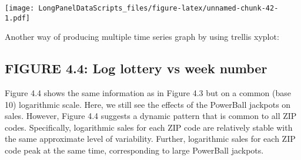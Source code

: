 \documentclass[]{book}
\newenvironment{Shaded}{\begin{snugshade}}{\end{snugshade}}
\newcommand{\CommentTok}[1]{\textcolor[rgb]{0.56,0.35,0.01}{\textit{#1}}}
\newcommand{\DataTypeTok}[1]{\textcolor[rgb]{0.13,0.29,0.53}{#1}}
\newcommand{\DecValTok}[1]{\textcolor[rgb]{0.00,0.00,0.81}{#1}}
\newcommand{\KeywordTok}[1]{\textcolor[rgb]{0.13,0.29,0.53}{\textbf{#1}}}
\newcommand{\NormalTok}[1]{#1}
\newcommand{\OperatorTok}[1]{\textcolor[rgb]{0.81,0.36,0.00}{\textbf{#1}}}
\newcommand{\StringTok}[1]{\textcolor[rgb]{0.31,0.60,0.02}{#1}}
\begin{document}
\texttt{[image: LongPanelDataScripts\_files/figure-latex/unnamed-chunk-42-1.pdf]}

Another way of producing multiple time series graph by using trellis xyplot:

\begin{Shaded}
\end{Shaded}

\hypertarget{figure-4.4-log-lottery-vs-week-number}{%
\subsection{FIGURE 4.4: Log lottery vs week number}\label{figure-4.4-log-lottery-vs-week-number}}

Figure 4.4 shows the same information as in Figure 4.3 but on a common (base 10) logarithmic scale. Here, we still see the effects of the PowerBall jackpots on sales. However, Figure 4.4 suggests a dynamic pattern that is common to all ZIP codes. Specifically, logarithmic sales for each ZIP code are relatively stable with the same approximate level of variability. Further, logarithmic sales for each ZIP code peak at the same time, corresponding to large PowerBall jackpots.
\end{document}
